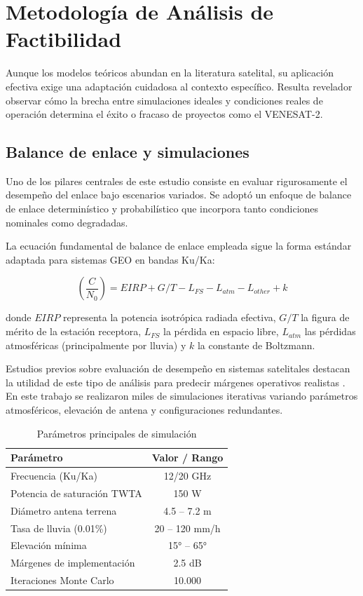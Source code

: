 \section{Metodología de Análisis de Factibilidad}

Aunque los modelos teóricos abundan en la literatura satelital, su aplicación efectiva exige una adaptación cuidadosa al contexto específico. Resulta revelador observar cómo la brecha entre simulaciones ideales y condiciones reales de operación determina el éxito o fracaso de proyectos como el VENESAT-2.

\subsection{Balance de enlace y simulaciones}

Uno de los pilares centrales de este estudio consiste en evaluar rigurosamente el desempeño del enlace bajo escenarios variados. Se adoptó un enfoque de balance de enlace determinístico y probabilístico que incorpora tanto condiciones nominales como degradadas.

La ecuación fundamental de balance de enlace empleada sigue la forma estándar adaptada para sistemas GEO en bandas Ku/Ka:

\begin{equation}
\left( \frac{C}{N_0} \right) = EIRP + G/T - L_{FS} - L_{atm} - L_{other} + k
\label{eq:link_budget}
\end{equation}

donde \(EIRP\) representa la potencia isotrópica radiada efectiva, \(G/T\) la figura de mérito de la estación receptora, \(L_{FS}\) la pérdida en espacio libre, \(L_{atm}\) las pérdidas atmosféricas (principalmente por lluvia) y \(k\) la constante de Boltzmann. 

Estudios previos sobre evaluación de desempeño en sistemas satelitales destacan la utilidad de este tipo de análisis para predecir márgenes operativos realistas \cite{LinkBudgetAnalysis2022}. En este trabajo se realizaron miles de simulaciones iterativas variando parámetros atmosféricos, elevación de antena y configuraciones redundantes.

\begin{table}[h]
\centering
\caption{Parámetros principales de simulación}
\label{tab:parametros_sim}
\begin{tabular}{lc}
\hline
\textbf{Parámetro} & \textbf{Valor / Rango} \\
\hline
Frecuencia (Ku/Ka) & 12/20 GHz \\
Potencia de saturación TWTA & 150 W \\
Diámetro antena terrena & 4.5 -- 7.2 m \\
Tasa de lluvia (0.01\%) & 20 -- 120 mm/h \\
Elevación mínima & 15° -- 65° \\
Márgenes de implementación & 2.5 dB \\
Iteraciones Monte Carlo & 10.000 \\
\hline
\end{tabular}
\end{table}

